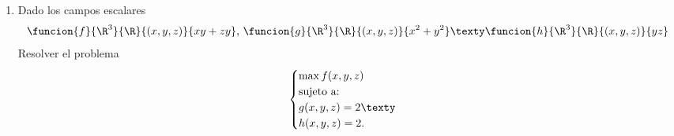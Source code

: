 \documentclass[a4,11pt]{aleph-examen}
\begin{document}
\begin{preguntas}
\begin{respuesta}
\begin{respuesta}
\begin{respuesta}
\begin{enumerate}
\item
    Dado los campos escalares
    \[
        \funcion{f}{\R^3}{\R}{(x,y,z)}{xy+zy}\\ \mbox{, } \funcion{g}{\R^3}{\R}{(x,y,z)}{x^2+y^2} \texty \funcion{h}{\R^3}{\R}{(x,y,z)}{yz}
    \]
    Resolver el problema
    \[
        \begin{cases}
            \max f(x,y,z)\\
            \text{sujeto  a:}\\
            g(x,y,z)=2 \texty\\
            h(x,y,z)=2.
        \end {cases}
    \]
    

\end{enumerate}
\end{respuesta}
\end{respuesta}
\end{respuesta}
\end{preguntas}
\end{document}
